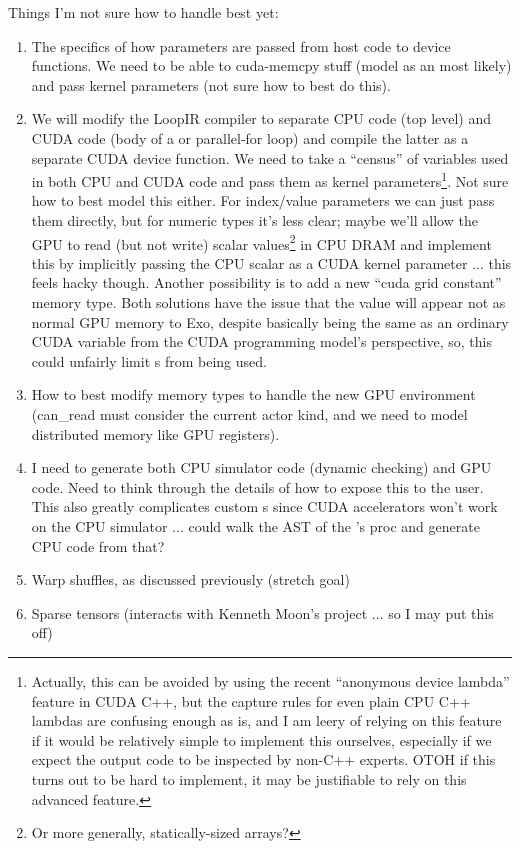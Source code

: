 \filbreak
{}

Things I'm not sure how to handle best yet:

\begin{enumerate}
  \item The specifics of how parameters are passed from host code to device functions.
  We need to be able to cuda-memcpy stuff (model as an  most likely) and pass kernel parameters (not sure how to best do this).
  \filbreak
  \item We will modify the LoopIR compiler to separate CPU code (top level) and CUDA code (body of a  or  parallel-for loop) and compile the latter as a separate CUDA device function.
  We need to take a ``census'' of variables used in both CPU and CUDA code and pass them as kernel parameters\footnote{Actually, this can be avoided by using the recent ``anonymous device lambda'' feature in CUDA C++, but the capture rules for even plain CPU C++ lambdas are confusing enough as is, and I am leery of relying on this feature if it would be relatively simple to implement this ourselves, especially if we expect the output code to be inspected by non-C++ experts. OTOH if this turns out to be hard to implement, it may be justifiable to rely on this advanced feature.}.
  Not sure how to best model this either. For index/value parameters we can just pass them directly, but for numeric types it's less clear; maybe we'll allow the GPU to read (but not write) scalar values\footnote{Or more generally, statically-sized arrays?} in CPU DRAM and implement this by implicitly passing the CPU scalar as a CUDA kernel parameter ... this feels hacky though.
  Another possibility is to add a new ``cuda grid constant'' memory type.
  Both solutions have the issue that the value will appear not as normal GPU memory to Exo, despite basically being the same as an ordinary CUDA variable from the CUDA programming model's perspective, so, this could unfairly limit s from being used.
  \filbreak
  \item How to best modify memory types to handle the new GPU environment (can\_read must consider the current actor kind, and we need to model distributed memory like GPU registers).
  \filbreak
  \item I need to generate both CPU simulator code (dynamic checking) and GPU code.
  Need to think through the details of how to expose this to the user.
  This also greatly complicates custom s since CUDA accelerators won't work on the CPU simulator ... could walk the AST of the 's proc and generate CPU code from that?
  \filbreak
  \item Warp shuffles, as discussed previously (stretch goal)
  \item Sparse tensors (interacts with Kenneth Moon's project ... so I may put this off)
\end{enumerate}


